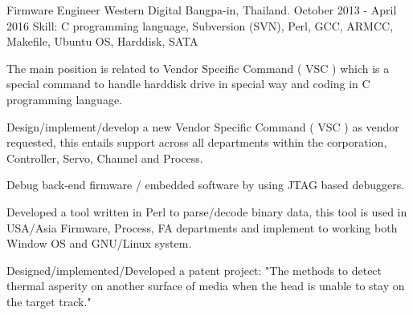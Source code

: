\begin{cventries}
  \cventry
    {Firmware Engineer} %
    {Western Digital} %
    {Bangpa-in, Thailand.} %
    {October 2013 - April 2016} %
    {Skill: C programming language, Subversion (SVN), Perl, GCC, ARMCC,
    Makefile, Ubuntu OS, Harddisk, SATA} %
    {
      \begin{cvitems} %
         \item {The main position is related to Vendor Specific Command ( VSC ) which is a special command to handle
          harddisk drive in special way and coding in C programming language.}
         \item {Design/implement/develop a new Vendor Specific Command ( VSC ) as vendor
         requested, this entails support across all departments within the corporation,
         Controller, Servo, Channel and Process.}
         \item {Debug back-end firmware / embedded software by using JTAG based
           debuggers.}
         \item {Developed a tool written in Perl to parse/decode binary data,
         this tool is used in USA/Asia Firmware, Process, FA departments and implement to
         working both Window OS and GNU/Linux system.}
         \item {Designed/implemented/Developed a patent project: "The methods to detect thermal asperity on another
          surface of media when the head is unable to stay on the target track."}
      \end{cvitems}
    }

\end{cventries}
